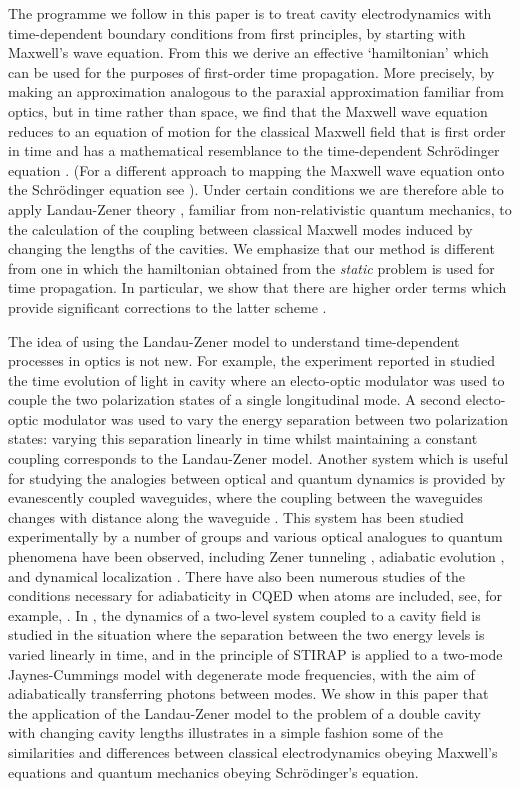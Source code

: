 \documentclass[twocolumn,english,pra,aps,superscriptaddress,floatfix]{revtex4-1}
\begin{document}
The programme we follow in this paper is to treat cavity electrodynamics with time-dependent boundary conditions from first principles, by starting with Maxwell's wave equation. From this we derive an effective `hamiltonian'  which can be used for the purposes of first-order time propagation.  More precisely, by making an approximation analogous to the paraxial approximation familiar from optics, but in time rather than space, we find that the Maxwell wave equation reduces to an equation of motion for the classical Maxwell field that is first order in time and has a mathematical resemblance to the time-dependent Schr\"{o}dinger equation \cite{liningtonthesis}. (For a different approach to mapping the Maxwell wave equation onto the Schr\"{o}dinger equation see \cite{winn99,malkova03}). Under certain conditions we are therefore able to apply Landau-Zener theory \cite{landau32,zener32,stenholm96}, familiar from non-relativistic quantum mechanics, to the calculation of the coupling between classical Maxwell modes induced by changing the lengths of the cavities. We emphasize that our method is different from one in which the hamiltonian obtained from the \emph{static} problem is used for time propagation.  In particular, we show that there are higher order terms which provide significant corrections to the latter scheme \cite{liningtonthesis}. 


The idea of using the Landau-Zener model to understand time-dependent processes in optics is not new. For example, the experiment reported in \cite{bouwmeester95} studied the time evolution of light in cavity where an electo-optic modulator was used to couple the two polarization states of a single longitudinal mode. A second electo-optic modulator  was used to vary the energy separation between two polarization states: varying this separation linearly in time whilst maintaining a constant coupling corresponds to the Landau-Zener model. Another system which is useful for studying the analogies between optical and quantum dynamics is provided by evanescently coupled waveguides, where the coupling between the waveguides changes with distance along the waveguide \cite{longhi07}. This system has been studied experimentally by a number of groups and various optical analogues to quantum phenomena have been observed, including Zener tunneling \cite{trompeter06}, adiabatic evolution \cite{lahini08}, and dynamical localization \cite{szameit10}. There have also been numerous studies of the conditions necessary for adiabaticity in CQED when atoms are included, see, for example, \cite{larson03}. In \cite{keeling08}, the dynamics of a two-level system coupled to a cavity field is studied in the situation where the separation between the two energy levels is varied linearly in time, and in \cite{mattinson01} the principle of STIRAP is applied to a two-mode Jaynes-Cummings model with degenerate mode frequencies, with the aim of adiabatically transferring photons between modes. 
We show in this paper that the application of the Landau-Zener model to the problem of a double cavity with changing cavity lengths illustrates in a simple fashion some of the similarities and differences between classical electrodynamics obeying Maxwell's equations and quantum mechanics obeying Schr\"{o}dinger's equation.
\end{document}
